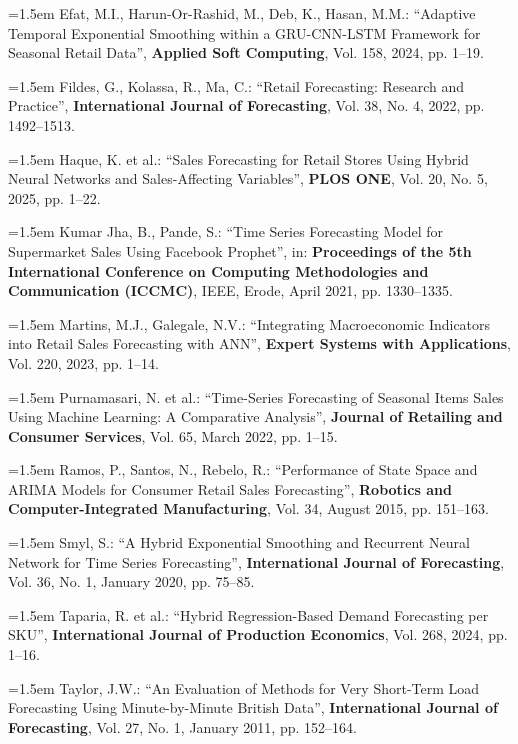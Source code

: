 \medskip\hangindent=1.5em
Efat, M.I., Harun-Or-Rashid, M., Deb, K., Hasan, M.M.: ``Adaptive Temporal
Exponential Smoothing within a GRU-CNN-LSTM Framework for Seasonal Retail
Data'', \textbf{Applied Soft Computing}, Vol. 158, 2024, pp. 1--19.

\medskip\hangindent=1.5em
Fildes, G., Kolassa, R., Ma, C.: ``Retail Forecasting: Research and
Practice'', \textbf{International Journal of Forecasting}, Vol. 38, No. 4,
2022, pp. 1492--1513.

\medskip\hangindent=1.5em
Haque, K. et al.: ``Sales Forecasting for Retail Stores Using Hybrid Neural
Networks and Sales-Affecting Variables'', \textbf{PLOS ONE}, Vol. 20, No. 5,
2025, pp. 1--22.

\medskip\hangindent=1.5em
Kumar Jha, B., Pande, S.: ``Time Series Forecasting Model for Supermarket
Sales Using Facebook Prophet'', in: \textbf{Proceedings of the 5th
International Conference on Computing Methodologies and Communication
(ICCMC)}, IEEE, Erode, April 2021, pp. 1330--1335.

\medskip\hangindent=1.5em
Martins, M.J., Galegale, N.V.: ``Integrating Macroeconomic Indicators into
Retail Sales Forecasting with ANN'', \textbf{Expert Systems with
Applications}, Vol. 220, 2023, pp. 1--14.

\medskip\hangindent=1.5em
Purnamasari, N. et al.: ``Time-Series Forecasting of Seasonal Items Sales
Using Machine Learning: A Comparative Analysis'', \textbf{Journal of
Retailing and Consumer Services}, Vol. 65, March 2022, pp. 1--15.

\medskip\hangindent=1.5em
Ramos, P., Santos, N., Rebelo, R.: ``Performance of State Space and ARIMA
Models for Consumer Retail Sales Forecasting'', \textbf{Robotics and
Computer-Integrated Manufacturing}, Vol. 34, August 2015, pp. 151--163.

\medskip\hangindent=1.5em
Smyl, S.: ``A Hybrid Exponential Smoothing and Recurrent Neural Network for
Time Series Forecasting'', \textbf{International Journal of Forecasting},
Vol. 36, No. 1, January 2020, pp. 75--85.

\medskip\hangindent=1.5em
Taparia, R. et al.: ``Hybrid Regression-Based Demand Forecasting per SKU'',
\textbf{International Journal of Production Economics}, Vol. 268, 2024,
pp. 1--16.

\medskip\hangindent=1.5em
Taylor, J.W.: ``An Evaluation of Methods for Very Short-Term Load Forecasting
Using Minute-by-Minute British Data'', \textbf{International Journal of
Forecasting}, Vol. 27, No. 1, January 2011, pp. 152--164.

